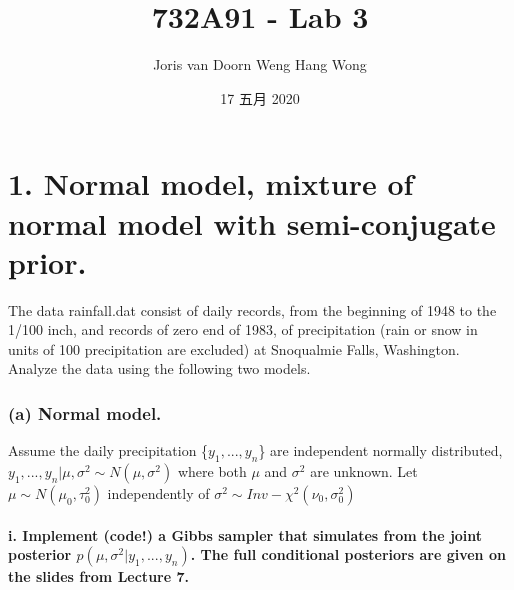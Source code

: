\documentclass[]{article}
\title{732A91 - Lab 3}
\author{Joris van Doorn \textbar\textbar{} Weng Hang Wong}
\date{17 五月 2020}
\let\oldparagraph\paragraph
\renewcommand{\paragraph}[1]{\oldparagraph{#1}\mbox{}}
\begin{document}
\maketitle

\hypertarget{normal-model-mixture-of-normal-model-with-semi-conjugate-prior.}{%
\section{1. Normal model, mixture of normal model with semi-conjugate
prior.}\label{normal-model-mixture-of-normal-model-with-semi-conjugate-prior.}}

The data rainfall.dat consist of daily records, from the beginning of
1948 to the 1/100 inch, and records of zero end of 1983, of
precipitation (rain or snow in units of 100 precipitation are excluded)
at Snoqualmie Falls, Washington. Analyze the data using the following
two models.

\hypertarget{a-normal-model.}{%
\subsubsection{(a) Normal model.}\label{a-normal-model.}}

Assume the daily precipitation \{\(y_1, ..., y_n\)\} are independent
normally distributed,
\(y_1,..., y_n |\mu,\sigma^2 \sim N(\mu,\sigma^2)\) where both \(\mu\)
and \(\sigma^2\) are unknown. Let \(\mu \sim N(\mu_0, \tau_0^2 )\)
independently of \(\sigma^2 \sim Inv- \chi^2(\nu_0,\sigma_0^2)\)

\hypertarget{i.-implement-code-a-gibbs-sampler-that-simulates-from-the-joint-posterior-pmu-sigma2-y_1-...-y_n-.-the-full-conditional-posteriors-are-given-on-the-slides-from-lecture-7.}{%
\paragraph{\texorpdfstring{i. Implement (code!) a Gibbs sampler that
simulates from the joint posterior
\(p(\mu, \sigma^2 |y_1 , ..., y_n )\). The full conditional posteriors
are given on the slides from Lecture
7.}{i. Implement (code!) a Gibbs sampler that simulates from the joint posterior p(\textbackslash mu, \textbackslash sigma\^{}2 \textbar y\_1 , ..., y\_n ). The full conditional posteriors are given on the slides from Lecture 7.}}\label{i.-implement-code-a-gibbs-sampler-that-simulates-from-the-joint-posterior-pmu-sigma2-y_1-...-y_n-.-the-full-conditional-posteriors-are-given-on-the-slides-from-lecture-7.}}
\end{document}
